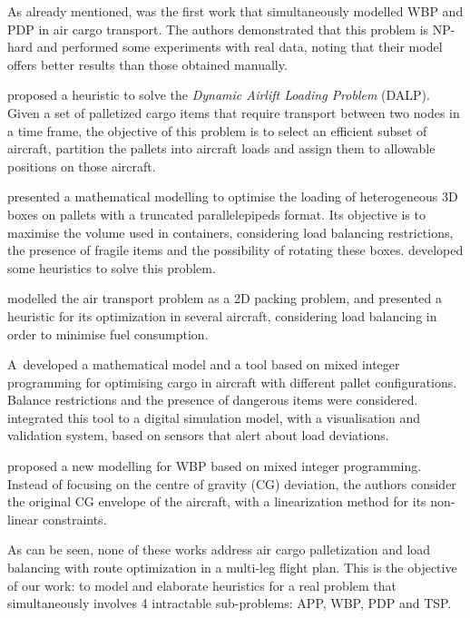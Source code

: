 \documentclass[preprint,authoryear]{elsarticle}
\begin{document}
As already mentioned, \cite{LurkinSchyns2015} was the first work that simultaneously modelled WBP and PDP in air cargo transport. The authors demonstrated that this problem is NP-hard and performed some experiments with real data, noting that their model offers better results than those obtained manually.

\cite{RoesenerBarnes2016} proposed a heuristic to solve the {\it Dynamic Airlift Loading Problem} (DALP). Given a set of palletized cargo items that require transport between two nodes in a time frame, the objective of this problem is to select an efficient subset of aircraft, partition the pallets into aircraft loads and assign them to allowable positions on those aircraft.

\cite{PaquaySchynsLimbourg2016} presented a mathematical modelling to optimise the loading of heterogeneous 3D boxes on pallets with a truncated parallelepipeds format. Its objective is to maximise the volume used in containers, considering load balancing restrictions, the presence of fragile items and the possibility of rotating these boxes. \cite{PaquayLimbourgSchynsOliveira2018} developed some heuristics to solve this problem.

\cite{YangLiuGao2018} modelled the air transport problem as a 2D packing problem, and presented a heuristic for its optimization in several aircraft, considering load balancing in order to minimise fuel consumption.

\cite{wong2020}A developed a mathematical model and a tool based on mixed integer programming for optimising cargo in aircraft with different pallet configurations. Balance restrictions and the presence of dangerous items were considered. \cite{eugene2021} integrated this tool to a digital simulation model, with a visualisation and validation system, based on sensors that alert about load deviations.

\cite{zhao2021} proposed a new modelling for WBP based on mixed integer programming. Instead of focusing on the centre of gravity (CG) deviation, the authors consider the original CG envelope of the aircraft, with a linearization method for its non-linear constraints.

As can be seen, none of these works address air cargo palletization and load balancing with route optimization in a multi-leg flight plan. This is the objective of our work: to model and elaborate heuristics for a real problem that simultaneously involves 4 intractable sub-problems: APP, WBP, PDP and TSP.
\end{document}
